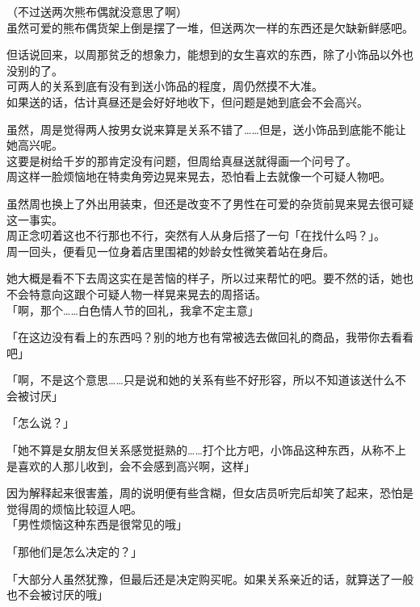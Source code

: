 （不过送两次熊布偶就没意思了啊）\\

虽然可爱的熊布偶货架上倒是摆了一堆，但送两次一样的东西还是欠缺新鲜感吧。

但话说回来，以周那贫乏的想象力，能想到的女生喜欢的东西，除了小饰品以外也没别的了。\\

可两人的关系到底有没有到送小饰品的程度，周仍然摸不大准。\\

如果送的话，估计真昼还是会好好地收下，但问题是她到底会不会高兴。

虽然，周是觉得两人按男女说来算是关系不错了……但是，送小饰品到底能不能让她高兴呢。\\

这要是树给千岁的那肯定没有问题，但周给真昼送就得画一个问号了。\\

周这样一脸烦恼地在特卖角旁边晃来晃去，恐怕看上去就像一个可疑人物吧。

虽然周也换上了外出用装束，但还是改变不了男性在可爱的杂货前晃来晃去很可疑这一事实。\\

周正念叨着这也不行那也不行，突然有人从身后搭了一句「在找什么吗？」。\\

周一回头，便看见一位身着店里围裙的妙龄女性微笑着站在身后。

她大概是看不下去周这实在是苦恼的样子，所以过来帮忙的吧。要不然的话，她也不会特意向这跟个可疑人物一样晃来晃去的周搭话。\\

「啊，那个……白色情人节的回礼，我拿不定主意」

「在这边没有看上的东西吗？别的地方也有常被选去做回礼的商品，我带你去看看吧」

「啊，不是这个意思……只是说和她的关系有些不好形容，所以不知道该送什么不会被讨厌」

「怎么说？」

「她不算是女朋友但关系感觉挺熟的……打个比方吧，小饰品这种东西，从称不上是喜欢的人那儿收到，会不会感到高兴啊，这样」

因为解释起来很害羞，周的说明便有些含糊，但女店员听完后却笑了起来，恐怕是觉得周的烦恼比较逗人吧。\\

「男性烦恼这种东西是很常见的哦」

「那他们是怎么决定的？」

「大部分人虽然犹豫，但最后还是决定购买呢。如果关系亲近的话，就算送了一般也不会被讨厌的哦」\\

